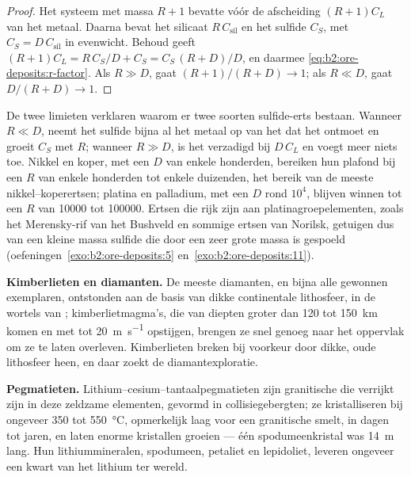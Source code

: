 \begin{proof}
Het systeem met massa $R + 1$ bevatte vóór de afscheiding $(R + 1)C_L$ van het metaal. Daarna bevat het silicaat
$R\,C_{\mathrm{sil}}$ en het sulfide $C_S$, met $C_S = D\,C_{\mathrm{sil}}$ in evenwicht.
Behoud geeft $(R + 1)C_L = R\,C_S/D + C_S = C_S\,(R + D)/D$, en daarmee
\eqref{eq:b2:ore-deposits:r-factor}. Als $R \gg D$, gaat $(R + 1)/(R + D) \to 1$; als $R \ll D$, gaat
$D/(R + D) \to 1$.
\end{proof}

De twee limieten verklaren waarom er twee soorten sulfide-erts bestaan. Wanneer $R \ll D$, neemt het sulfide
bijna al het metaal op van het  dat het ontmoet en groeit $C_S$ met $R$; wanneer $R \gg D$, is het
verzadigd bij $D\,C_L$ en voegt meer  niets toe. Nikkel en koper, met een $D$ van enkele honderden,
bereiken hun plafond bij een $R$ van enkele honderden tot enkele duizenden, het bereik van de meeste
nikkel--koperertsen; platina en palladium, met een $D$ rond $10^4$, blijven winnen tot een $R$ van \num{10000} tot
\num{100000}. Ertsen die rijk zijn aan platinagroepelementen, zoals het Merensky-rif van het Bushveld en
sommige ertsen van Norilsk, getuigen dus van een kleine massa sulfide die door een zeer grote massa
 is gespoeld (oefeningen~\ref{exo:b2:ore-deposits:5} en~\ref{exo:b2:ore-deposits:11}).

\textbf{Kimberlieten en diamanten.} De meeste diamanten, en bijna alle gewonnen exemplaren, ontstonden aan de basis van
dikke continentale lithosfeer, in de wortels van ; kimberlietmagma's, die van diepten
groter dan 120 tot \qty{150}{km} komen en met tot \qty{20}{m.s^{-1}} opstijgen, brengen ze snel genoeg naar het
oppervlak om ze te laten overleven. Kimberlieten breken bij voorkeur door dikke, oude lithosfeer heen,
en daar zoekt de diamantexploratie.

\textbf{Pegmatieten.} Lithium--cesium--tantaalpegmatieten zijn granitische  die verrijkt zijn in deze zeldzame
elementen, gevormd in collisiegebergten; ze kristalliseren bij ongeveer 350 tot \qty{550}{\celsius},
opmerkelijk laag voor een granitische smelt, in dagen tot jaren, en laten enorme kristallen groeien --- één
spodumeenkristal was \qty{14}{m} lang. Hun lithiummineralen, spodumeen, petaliet en
lepidoliet, leveren ongeveer een kwart van het lithium ter wereld.

